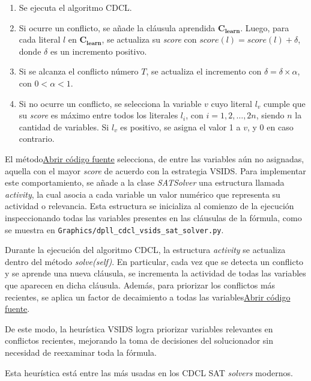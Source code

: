 \begin{enumerate}
    \item Se ejecuta el algoritmo CDCL.
    \item Si ocurre un conflicto, se añade la cláusula aprendida \(\mathbf{C_{learn}}\). Luego, para cada literal \( l \) en \(\mathbf{C_{learn}}\), se actualiza su \textit{score} con \(score(l) = score(l) + \delta\), donde \(\delta\) es un incremento positivo.
    \item Si se alcanza el conflicto número \( T \), se actualiza el incremento con \( \delta = \delta \times \alpha \), con \(0 < \alpha < 1\).
    \item Si no ocurre un conflicto, se selecciona la variable \( v \) cuyo literal \( l_v \) cumple que su \textit{score} es máximo entre todos los literales \( l_i \), con \( i = 1, 2, \ldots, 2n \), siendo \( n \) la cantidad de variables. Si \( l_v \) es positivo, se asigna el valor 1 a \( v \), y 0 en caso contrario.
\end{enumerate}

El método\href{Graphics/dpll\_cdcl\_vsids\_sat\_solver.py}{Abrir c\'odigo fuente} selecciona, de entre las variables aún no asignadas, aquella con el mayor \textit{score} de acuerdo con la estrategia VSIDS. Para implementar este comportamiento, se añade a la clase \textit{SATSolver} una estructura llamada \textit{activity}, la cual asocia a cada variable un valor numérico que representa su actividad o relevancia. Esta estructura se inicializa al comienzo de la ejecución inspeccionando todas las variables presentes en las cláusulas de la fórmula, como se muestra en \texttt{Graphics/dpll\_cdcl\_vsids\_sat\_solver.py}.

Durante la ejecución del algoritmo CDCL, la estructura \textit{activity} se actualiza dentro del método \textit{solve(self)}. En particular, cada vez que se detecta un conflicto y se aprende una nueva cláusula, se incrementa la actividad de todas las variables que aparecen en dicha cláusula. Además, para priorizar los conflictos más recientes, se aplica un factor de decaimiento a todas las variables\href{Graphics/dpll\_cdcl\_vsids\_sat\_solver.py}{Abrir c\'odigo fuente}.

De este modo, la heurística VSIDS logra priorizar variables relevantes en conflictos recientes, mejorando la toma de decisiones del solucionador sin necesidad de reexaminar toda la fórmula.

Esta heur\'istica est\'a entre las m\'as usadas en los CDCL SAT \textit{solvers} modernos.


